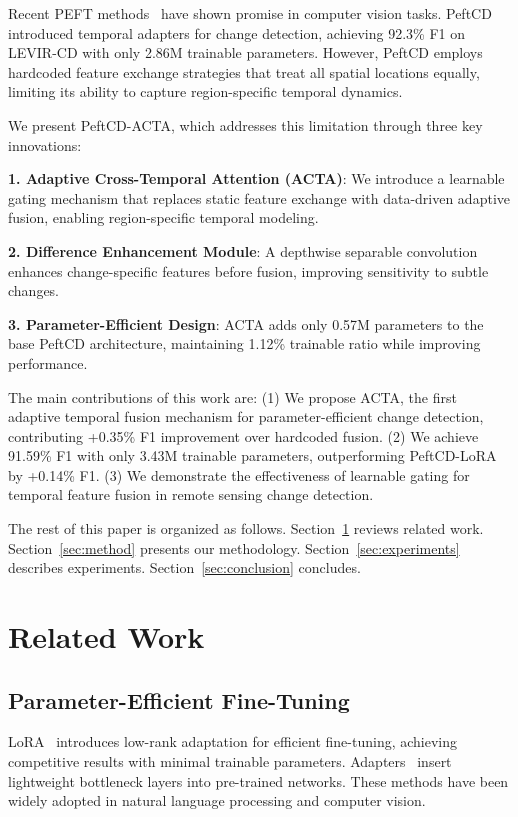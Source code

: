 \documentclass{IEEEtran}
\begin{document}
Recent PEFT methods~\cite{hu2021loRA,houles2022adapter} have shown promise in computer vision tasks. PeftCD~\cite{zhang2024peftcd} introduced temporal adapters for change detection, achieving 92.3\% F1 on LEVIR-CD with only 2.86M trainable parameters. However, PeftCD employs hardcoded feature exchange strategies that treat all spatial locations equally, limiting its ability to capture region-specific temporal dynamics.

We present PeftCD-ACTA, which addresses this limitation through three key innovations:

\textbf{1. Adaptive Cross-Temporal Attention (ACTA)}: We introduce a learnable gating mechanism that replaces static feature exchange with data-driven adaptive fusion, enabling region-specific temporal modeling.

\textbf{2. Difference Enhancement Module}: A depthwise separable convolution enhances change-specific features before fusion, improving sensitivity to subtle changes.

\textbf{3. Parameter-Efficient Design}: ACTA adds only 0.57M parameters to the base PeftCD architecture, maintaining 1.12\% trainable ratio while improving performance.

The main contributions of this work are: (1) We propose ACTA, the first adaptive temporal fusion mechanism for parameter-efficient change detection, contributing +0.35\% F1 improvement over hardcoded fusion. (2) We achieve 91.59\% F1 with only 3.43M trainable parameters, outperforming PeftCD-LoRA by +0.14\% F1. (3) We demonstrate the effectiveness of learnable gating for temporal feature fusion in remote sensing change detection.

The rest of this paper is organized as follows. Section~\ref{sec:related} reviews related work. Section~\ref{sec:method} presents our methodology. Section~\ref{sec:experiments} describes experiments. Section~\ref{sec:conclusion} concludes.

\section{Related Work}
\label{sec:related}

\subsection{Parameter-Efficient Fine-Tuning}

LoRA~\cite{hu2021loRA} introduces low-rank adaptation for efficient fine-tuning, achieving competitive results with minimal trainable parameters. Adapters~\cite{houles2022adapter} insert lightweight bottleneck layers into pre-trained networks. These methods have been widely adopted in natural language processing and computer vision.
\end{document}
